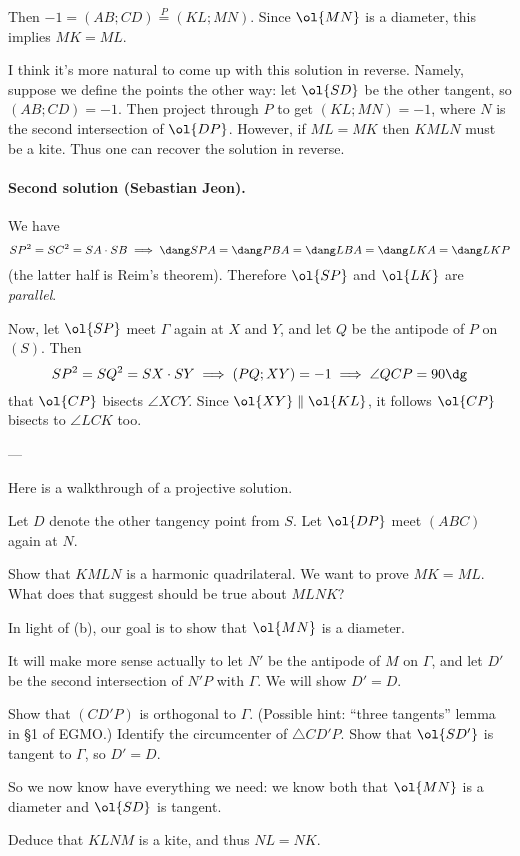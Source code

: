 Then $-1 = (AB;CD) \overset{P}{=} (KL;MN)$.
Since $\ol{MN}$ is a diameter, this implies $MK = ML$.

\begin{remark*}
  I think it's more natural to come up with
  this solution in reverse.
  Namely, suppose we define the points the other way:
  let $\ol{SD}$ be the other tangent, so $(AB;CD) = -1$.
  Then project through $P$ to get $(KL;MN) = -1$,
  where $N$ is the second intersection of $\ol{DP}$.
  However, if $ML = MK$ then $KMLN$ must be a kite.
  Thus one can recover the solution in reverse.
\end{remark*}

\paragraph{Second solution (Sebastian Jeon).}
We have \[ SP^2 = SC^2 = SA \cdot SB
  \implies
  \dang SPA = \dang PBA = \dang LBA = \dang LKA = \dang LKP \]
(the latter half is Reim's theorem).
Therefore $\ol{SP}$ and $\ol{LK}$ are \emph{parallel}.

Now, let $\ol{SP}$ meet $\Gamma$ again at $X$ and $Y$,
and let $Q$ be the antipode of $P$ on $(S)$.
Then
\[ SP^2 = SQ^2 = SX \cdot SY
  \implies (PQ;XY) = -1 \implies \angle QCP = 90\dg \]
that $\ol{CP}$ bisects $\angle XCY$.
Since $\ol{XY} \parallel \ol{KL}$,
it follows $\ol{CP}$ bisects to $\angle LCK$ too.

---

Here is a walkthrough of a projective solution.

Let $D$ denote the other tangency point from $S$.
Let $\ol{DP}$ meet $(ABC)$ again at $N$.
\begin{walk}
  \ii Show that $KMLN$ is a harmonic quadrilateral.
  \ii We want to prove $MK = ML$.
  What does that suggest should be true about $MLNK$?
\end{walk}
In light of (b), our goal is to show that $\ol{MN}$ is a diameter.

It will make more sense actually to
let $N'$ be the antipode of $M$ on $\Gamma$,
and let $D'$ be the second intersection of $N'P$ with $\Gamma$.
We will show $D' = D$.
\begin{walk}[resume]
  \ii Show that $(CD'P)$ is orthogonal to $\Gamma$.
  (Possible hint: ``three tangents'' lemma in \S1 of EGMO.)
  \ii Identify the circumcenter of $\triangle CD'P$.
  \ii Show that $\ol{SD'}$ is tangent to $\Gamma$, so $D' = D$.
\end{walk}

So we now know have everything we need:
we know both that $\ol{MN}$ is a diameter and $\ol{SD}$ is tangent.
\begin{walk}[resume]
  \ii Deduce that $KLNM$ is a kite, and thus $NL = NK$.
\end{walk}
